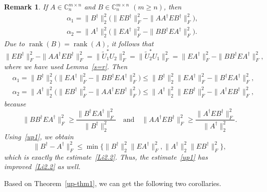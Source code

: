 \documentclass[11pt]{article}
\newtheorem{remark}{Remark}[section]
\DeclareMathOperator*{\rank}{rank}
\begin{document}
\begin{remark}\rm
If $A\in\mathbb{C}^{m\times n}_{n}$ and $B\in\mathbb{C}^{m\times n}_{n}$ $(m\geq n)$, then
\begin{align*}
&\alpha_{1}=\|B^{\dagger}\|_{2}^{2}\big(\|EB^{\dagger}\|_{F}^{2}-\|AA^{\dagger}EB^{\dagger}\|_{F}^{2}\big),\\ &\alpha_{2}=\|A^{\dagger}\|_{2}^{2}\big(\|EA^{\dagger}\|_{F}^{2}-\|BB^{\dagger}EA^{\dagger}\|_{F}^{2}\big).
\end{align*}
Due to $\rank(B)=\rank(A)$, it follows that
\begin{displaymath}
\|EB^{\dagger}\|_{F}^{2}-\|AA^{\dagger}EB^{\dagger}\|_{F}^{2}=\|\widetilde{U}_{1}^{\ast}U_{2}\|_{F}^{2}=\|\widetilde{U}_{2}^{\ast}U_{1}\|_{F}^{2}=\|EA^{\dagger}\|_{F}^{2}-\|BB^{\dagger}EA^{\dagger}\|_{F}^{2},
\end{displaymath}
where we have used Lemma~\ref{s=r}. Then
\begin{align*}
&\alpha_{1}=\|B^{\dagger}\|_{2}^{2}\big(\|EA^{\dagger}\|_{F}^{2}-\|BB^{\dagger}EA^{\dagger}\|_{F}^{2}\big)\leq\|B^{\dagger}\|_{2}^{2}\|EA^{\dagger}\|_{F}^{2}-\|B^{\dagger}EA^{\dagger}\|_{F}^{2},\\
&\alpha_{2}=\|A^{\dagger}\|_{2}^{2}\big(\|EB^{\dagger}\|_{F}^{2}-\|AA^{\dagger}EB^{\dagger}\|_{F}^{2}\big)\leq\|A^{\dagger}\|_{2}^{2}\|EB^{\dagger}\|_{F}^{2}-\|A^{\dagger}EB^{\dagger}\|_{F}^{2},
\end{align*}
because
\begin{displaymath}
\|BB^{\dagger}EA^{\dagger}\|_{F}^{2}\geq\frac{\|B^{\dagger}EA^{\dagger}\|_{F}^{2}}{\|B^{\dagger}\|_{2}^{2}} \quad \text{and} \quad \|AA^{\dagger}EB^{\dagger}\|_{F}^{2}\geq\frac{\|A^{\dagger}EB^{\dagger}\|_{F}^{2}}{\|A^{\dagger}\|_{2}^{2}}.
\end{displaymath}
Using~\eqref{up1}, we obtain
\begin{displaymath}
\|B^{\dagger}-A^{\dagger}\|_{F}^{2}\leq\min\big\{\|B^{\dagger}\|_{2}^{2}\|EA^{\dagger}\|_{F}^{2},\|A^{\dagger}\|_{2}^{2}\|EB^{\dagger}\|_{F}^{2}\big\},
\end{displaymath}
which is exactly the estimate~\eqref{Li2.2}. Thus, the estimate~\eqref{up1} has improved~\eqref{Li2.2} as well.
\end{remark}

Based on Theorem~\ref{up-thm1}, we can get the following two corollaries.
\end{document}
